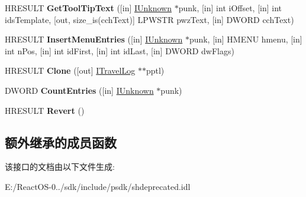 \begin{DoxyCompactItemize}
\item 
\mbox{\label{interface_i_travel_log_ae6cc3ff7ed3468d69bd6961986436c6c}} 
H\+R\+E\+S\+U\+LT {\bfseries Get\+Tool\+Tip\+Text} (\mbox{[}in\mbox{]} \hyperlink{interface_i_unknown}{I\+Unknown} $\ast$punk, \mbox{[}in\mbox{]} int i\+Offset, \mbox{[}in\mbox{]} int ids\+Template, \mbox{[}out, size\+\_\+is(cch\+Text)\mbox{]} L\+P\+W\+S\+TR pwz\+Text, \mbox{[}in\mbox{]} D\+W\+O\+RD cch\+Text)
\item 
\mbox{\label{interface_i_travel_log_ad3c9be62ce3ca1b42e4e4d555c4a3880}} 
H\+R\+E\+S\+U\+LT {\bfseries Insert\+Menu\+Entries} (\mbox{[}in\mbox{]} \hyperlink{interface_i_unknown}{I\+Unknown} $\ast$punk, \mbox{[}in\mbox{]} H\+M\+E\+NU hmenu, \mbox{[}in\mbox{]} int n\+Pos, \mbox{[}in\mbox{]} int id\+First, \mbox{[}in\mbox{]} int id\+Last, \mbox{[}in\mbox{]} D\+W\+O\+RD dw\+Flags)
\item 
\mbox{\label{interface_i_travel_log_adb44b676bfcfa911031ead94486e0026}} 
H\+R\+E\+S\+U\+LT {\bfseries Clone} (\mbox{[}out\mbox{]} \hyperlink{interface_i_travel_log}{I\+Travel\+Log} $\ast$$\ast$pptl)
\item 
\mbox{\label{interface_i_travel_log_a0a3bf357dafeea0a3a854b6e7f44569f}} 
D\+W\+O\+RD {\bfseries Count\+Entries} (\mbox{[}in\mbox{]} \hyperlink{interface_i_unknown}{I\+Unknown} $\ast$punk)
\item 
\mbox{\label{interface_i_travel_log_ae40979fb7a14baded18d4e90966eb839}} 
H\+R\+E\+S\+U\+LT {\bfseries Revert} ()
\end{DoxyCompactItemize}
\subsection*{额外继承的成员函数}


该接口的文档由以下文件生成\+:\begin{DoxyCompactItemize}
\item 
E\+:/\+React\+O\+S-\/0../sdk/include/psdk/shdeprecated.\+idl\end{DoxyCompactItemize}
